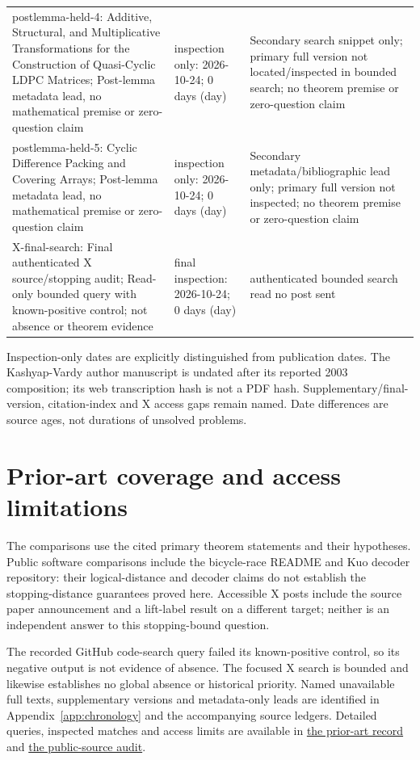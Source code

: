 {\begin{longtable}{@{}>{\raggedright\arraybackslash}p{.27\linewidth}>{\raggedright\arraybackslash}p{.47\linewidth}>{\raggedright\arraybackslash}p{.18\linewidth}@{}}
postlemma-held-4: Additive, Structural, and Multiplicative Transformations for the Construction of Quasi-Cyclic LDPC Matrices; Post-lemma metadata lead, no mathematical premise or zero-question claim & inspection only: 2026-10-24; 0 days (day) & Secondary search snippet only; primary full version not located/inspected in bounded search; no theorem premise or zero-question claim\\[4pt]
postlemma-held-5: Cyclic Difference Packing and Covering Arrays; Post-lemma metadata lead, no mathematical premise or zero-question claim & inspection only: 2026-10-24; 0 days (day) & Secondary metadata/bibliographic lead only; primary full version not inspected; no theorem premise or zero-question claim\\[4pt]
X-final-search: Final authenticated X source/stopping audit; Read-only bounded query with known-positive control; not absence or theorem evidence & final inspection: 2026-10-24; 0 days (day) & authenticated bounded search read no post sent\\[4pt]
\bottomrule\end{longtable}
}
Inspection-only dates are explicitly distinguished from publication dates. The Kashyap-Vardy author manuscript is undated after its reported 2003 composition; its web transcription hash is not a PDF hash. Supplementary/final-version, citation-index and X access gaps remain named. Date differences are source ages, not durations of unsolved problems.
\clearpage\section{Prior-art coverage and access limitations}\label{app:ledger}
The comparisons use the cited primary theorem statements and their hypotheses.
Public software comparisons include the bicycle-race README and Kuo decoder
repository: their logical-distance and decoder claims do not establish the
stopping-distance guarantees proved here. Accessible X posts include the source
paper announcement and a lift-label result on a different target; neither is
an independent answer to this stopping-bound question.

The recorded GitHub code-search query failed its known-positive control, so its
negative output is not evidence of absence. The focused X search is bounded
and likewise establishes no global absence or historical priority. Named
unavailable full texts, supplementary versions and metadata-only leads are
identified in Appendix~\ref{app:chronology} and the accompanying source ledgers.
Detailed queries, inspected matches and access limits are available in
\href{https://github.com/alectionary/vibe-math/blob/master/formalization/stopping-bound/stronger/prior-art.json}{the prior-art record}
and
\href{https://github.com/alectionary/vibe-math/blob/master/formalization/stopping-bound/stronger/X-GITHUB-FINAL-AUDIT.json}{the public-source audit}.

